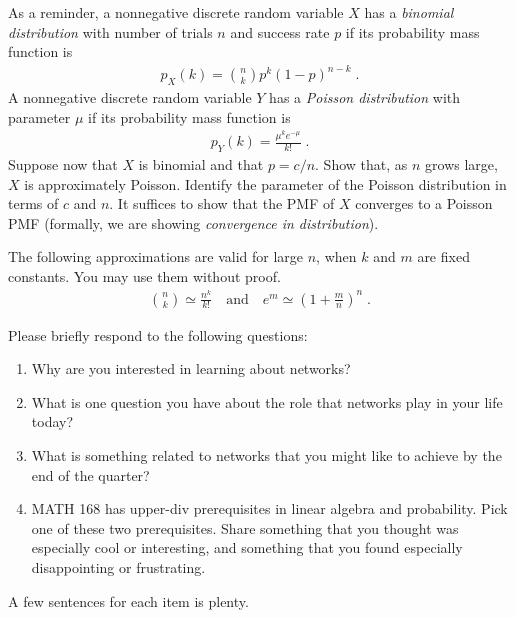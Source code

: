\documentclass{hw}
\begin{document}
    As a reminder, a nonnegative discrete random variable $X$ has a \emph{binomial distribution} with number of trials $n$ and success rate $p$ if its probability mass function is 
    \begin{align*}
        p_X(k) = \binom{n}{k}p^{k}(1-p)^{n-k}\;. 
    \end{align*}
    A nonnegative discrete random variable $Y$ has a \emph{Poisson distribution} with parameter $\mu$ if its probability mass function is 
    \begin{align*}
        p_Y(k) = \frac{\mu^ke^{-\mu}}{k!}\;. 
    \end{align*}
    Suppose now that $X$ is binomial and that $p = c / n$. 
    Show that, as $n$ grows large, $X$ is approximately Poisson. 
    Identify the parameter of the Poisson distribution in terms of $c$ and $n$. 
    It suffices to show that the PMF of $X$ converges to a Poisson PMF (formally, we are showing \emph{convergence in distribution}). 

    The following approximations are valid for large $n$, when $k$ and $m$ are fixed constants.  
    You may use them without proof. 
    \begin{align*}
        \binom{n}{k} \simeq \frac{n^k}{k!} \quad \text{and} \quad 
        e^{m}      \simeq \left(1 + \frac{m}{n}\right)^{n}\;.        
    \end{align*} 

    \solution

\problem{}

Please briefly respond to the following questions: 
\begin{enumerate}
    \item Why are you interested in learning about networks? 
    \item What is one question you have about the role that networks play in your life today?
    \item What is something related to networks that you might like to achieve by the end of the quarter? 
    \item MATH 168 has upper-div prerequisites in linear algebra and probability. 
    Pick one of these two prerequisites. 
    Share something that you thought was especially cool or interesting, and something that you found especially disappointing or frustrating. 
\end{enumerate}
A few sentences for each item is plenty. 
\end{document}

